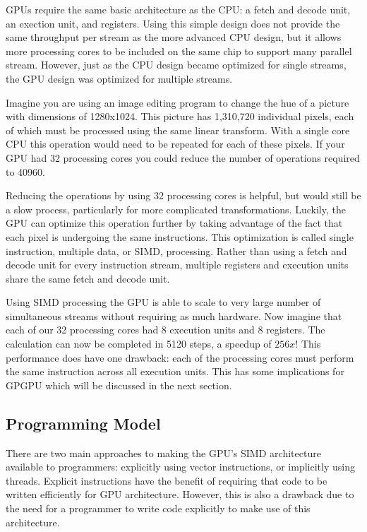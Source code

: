 GPUs require the same basic architecture as the CPU: a fetch and decode unit, an exection unit, and registers. Using this simple design does not provide the same throughput per stream as the more advanced CPU design, but it allows more processing cores to be included on the same chip to support many parallel stream. However, just as the CPU design became optimized for single streams, the GPU design was optimized for multiple streams.

Imagine you are using an image editing program to change the hue of a picture with dimensions of 1280x1024. This picture has 1,310,720 individual pixels, each of which must be processed using the same linear transform. With a single core CPU this operation would need to be repeated for each of these pixels. If your GPU had 32 processing cores you could reduce the number of operations required to 40960.

Reducing the operations by using 32 processing cores is helpful, but would still be a slow process, particularly for more complicated transformations. Luckily, the GPU can optimize this operation further by taking advantage of the fact that each pixel is undergoing the same instructions. This optimization is called single instruction, multiple data, or SIMD, processing. Rather than using a fetch and decode unit for every instruction stream, multiple registers and execution units share the same fetch and decode unit.

Using SIMD processing the GPU is able to scale to very large number of simultaneous streams without requiring as much hardware. Now imagine that each of our 32 processing cores had 8 execution units and 8 registers. The calculation can now be completed in 5120 steps, a speedup of $256x$! This performance does have one drawback: each of the processing cores must perform the same instruction across all execution units. This has some implications for GPGPU which will be discussed in the next section.

\subsection{Programming Model}

There are two main approaches to making the GPU's SIMD architecture available to programmers: explicitly using vector instructions, or implicitly using threads. Explicit instructions have the benefit of requiring that code to be written efficiently for GPU architecture. However, this is also a drawback due to the need for a programmer to write code explicitly to make use of this architecture. \cite{GPGPU}

